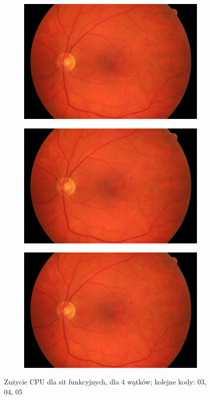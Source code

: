 \documentclass[12pt]{article}
\begin{document}
\begin{figure}[h!]
	\centering
	\begin{subfigure}[b]{0.32\linewidth}
		\includegraphics[width=\linewidth]{images/01_dr.jpg}
	\end{subfigure}
	\begin{subfigure}[b]{0.32\linewidth}
		\includegraphics[width=\linewidth]{images/01_dr.jpg}
	\end{subfigure}
	\begin{subfigure}[b]{0.32\linewidth}
		\includegraphics[width=\linewidth]{images/01_dr.jpg}
	\end{subfigure}
	\caption{Zużycie CPU dla sit funkcyjnych, dla 4 wątków; kolejne kody: 03, 04, 05}
\end{figure}
\end{document}
